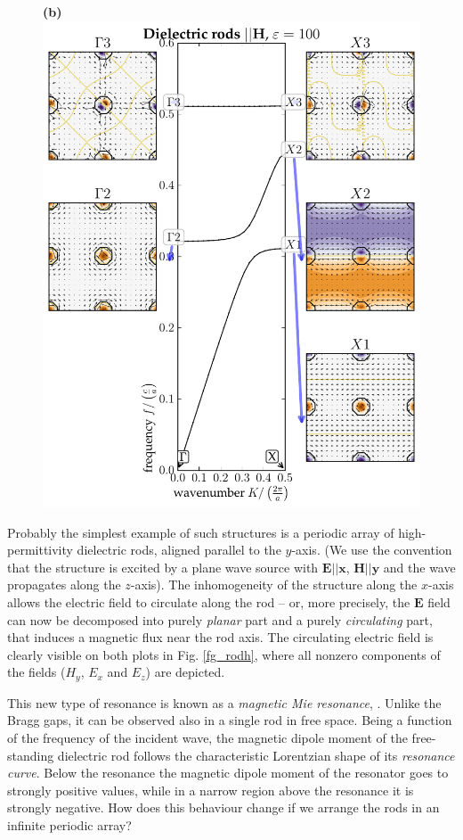 {\begin{figure}[ht]
\textbf{(b)}	\includegraphics[width=.45\textwidth]{img/HRods_eps100_R12_PWEM.pdf}
\end{figure} %

Probably the simplest example of such structures is a periodic array of high-permittivity dielectric rods, aligned parallel to the $y$-axis. (We use the convention that the structure is excited by a plane wave source with $\mathbf E || \mathbf x$, $\mathbf H || \mathbf y$ and the wave propagates along the $z$-axis). %
The inhomogeneity of the structure along the $x$-axis allows the electric field to circulate along the rod -- or, more precisely, the $\mathbf E$ field can now be decomposed into purely \textit{planar} part and a purely \textit{circulating} part, that induces a magnetic flux near the rod axis. The circulating electric field is clearly visible on both plots in Fig. \ref{fg_rodh}, where all nonzero components of the fields ($H_y$, $E_x$ and $E_z$) are depicted. 

This new type of resonance is known as a \textit{magnetic Mie resonance}, \cite{obrien2002photonic, nemec2009tunable, yahiaoui2009broadband, yahiaoui2011tunable}. Unlike the Bragg gaps, it can be observed also in a single rod in free space. Being a function of the frequency of the incident wave, the magnetic dipole moment of the free-standing dielectric rod follows the characteristic Lorentzian shape of its \textit{resonance curve}. Below the resonance the magnetic dipole moment of the resonator goes to strongly positive values, while in a narrow region above the resonance it is strongly negative. How does this behaviour change if we arrange the rods in an infinite periodic array? 


}
